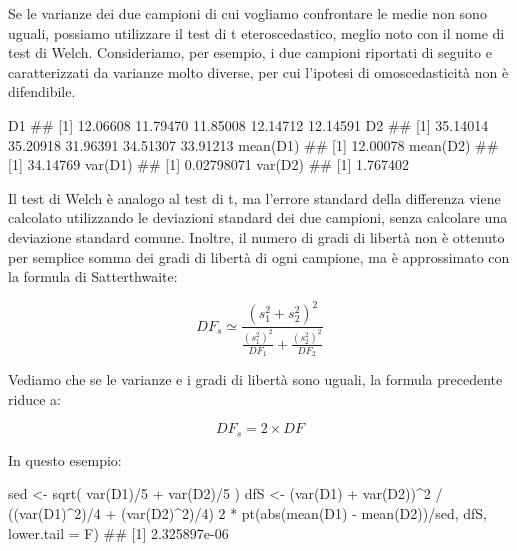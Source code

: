 \documentclass[a4paper,12pt,oneside]{book}
\newenvironment{Shaded}{\begin{snugshade}}{\end{snugshade}}
\newcommand{\DecValTok}[1]{#1}
\newcommand{\SpecialCharTok}[1]{#1}
\newcommand{\DocumentationTok}[1]{#1}
\newcommand{\OtherTok}[1]{#1}
\newcommand{\FunctionTok}[1]{#1}
\newcommand{\AttributeTok}[1]{#1}
\newcommand{\NormalTok}[1]{#1}
\begin{document}
Se le varianze dei due campioni di cui vogliamo confrontare le medie non sono uguali, possiamo utilizzare il test di t eteroscedastico, meglio noto con il nome di test di Welch. Consideriamo, per esempio, i due campioni riportati di seguito e caratterizzati da varianze molto diverse, per cui l'ipotesi di omoscedasticità non è difendibile.

\begin{Shaded}
\begin{Highlighting}[]
\NormalTok{D1}
\DocumentationTok{\#\# [1] 12.06608 11.79470 11.85008 12.14712 12.14591}
\NormalTok{D2}
\DocumentationTok{\#\# [1] 35.14014 35.20918 31.96391 34.51307 33.91213}
\FunctionTok{mean}\NormalTok{(D1)}
\DocumentationTok{\#\# [1] 12.00078}
\FunctionTok{mean}\NormalTok{(D2)}
\DocumentationTok{\#\# [1] 34.14769}
\FunctionTok{var}\NormalTok{(D1)}
\DocumentationTok{\#\# [1] 0.02798071}
\FunctionTok{var}\NormalTok{(D2)}
\DocumentationTok{\#\# [1] 1.767402}
\end{Highlighting}
\end{Shaded}

Il test di Welch è analogo al test di t, ma l'errore standard della differenza viene calcolato utilizzando le deviazioni standard dei due campioni, senza calcolare una deviazione standard comune. Inoltre, il numero di gradi di libertà non è ottenuto per semplice somma dei gradi di libertà di ogni campione, ma è approssimato con la formula di Satterthwaite:

\[DF_s \simeq \frac{ \left( s^2_1 + s^2_2 \right)^2 }{ \frac{(s^2_1)^2}{DF_1} + \frac{(s^2_2)^2}{DF_2} }\]

Vediamo che se le varianze e i gradi di libertà sono uguali, la formula precedente riduce a:

\[DF_s = 2 \times DF\]

In questo esempio:

\begin{Shaded}
\begin{Highlighting}[]
\NormalTok{sed }\OtherTok{\textless{}{-}} \FunctionTok{sqrt}\NormalTok{( }\FunctionTok{var}\NormalTok{(D1)}\SpecialCharTok{/}\DecValTok{5} \SpecialCharTok{+} \FunctionTok{var}\NormalTok{(D2)}\SpecialCharTok{/}\DecValTok{5}\NormalTok{ )}
\NormalTok{dfS }\OtherTok{\textless{}{-}}\NormalTok{ (}\FunctionTok{var}\NormalTok{(D1) }\SpecialCharTok{+} \FunctionTok{var}\NormalTok{(D2))}\SpecialCharTok{\^{}}\DecValTok{2} \SpecialCharTok{/} 
\NormalTok{  ((}\FunctionTok{var}\NormalTok{(D1)}\SpecialCharTok{\^{}}\DecValTok{2}\NormalTok{)}\SpecialCharTok{/}\DecValTok{4} \SpecialCharTok{+}\NormalTok{ (}\FunctionTok{var}\NormalTok{(D2)}\SpecialCharTok{\^{}}\DecValTok{2}\NormalTok{)}\SpecialCharTok{/}\DecValTok{4}\NormalTok{)}
\DecValTok{2} \SpecialCharTok{*} \FunctionTok{pt}\NormalTok{(}\FunctionTok{abs}\NormalTok{(}\FunctionTok{mean}\NormalTok{(D1) }\SpecialCharTok{{-}} \FunctionTok{mean}\NormalTok{(D2))}\SpecialCharTok{/}\NormalTok{sed, dfS, }\AttributeTok{lower.tail =}\NormalTok{ F)}
\DocumentationTok{\#\# [1] 2.325897e{-}06}
\end{Highlighting}
\end{Shaded}
\end{document}
